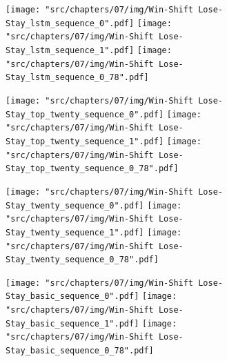 \begin{figure}[!htbp]
    \begin{subfigure}{\textwidth}
        \texttt{[image: "src/chapters/07/img/Win-Shift Lose-Stay\_lstm\_sequence\_0".pdf]}
        \texttt{[image: "src/chapters/07/img/Win-Shift Lose-Stay\_lstm\_sequence\_1".pdf]}
        \texttt{[image: "src/chapters/07/img/Win-Shift Lose-Stay\_lstm\_sequence\_0\_78".pdf]}
    \end{subfigure}
    \begin{subfigure}{\textwidth}
        \texttt{[image: "src/chapters/07/img/Win-Shift Lose-Stay\_top\_twenty\_sequence\_0".pdf]}
        \texttt{[image: "src/chapters/07/img/Win-Shift Lose-Stay\_top\_twenty\_sequence\_1".pdf]}
        \texttt{[image: "src/chapters/07/img/Win-Shift Lose-Stay\_top\_twenty\_sequence\_0\_78".pdf]}
    \end{subfigure}
    \begin{subfigure}{\textwidth}
        \texttt{[image: "src/chapters/07/img/Win-Shift Lose-Stay\_twenty\_sequence\_0".pdf]}
        \texttt{[image: "src/chapters/07/img/Win-Shift Lose-Stay\_twenty\_sequence\_1".pdf]}
        \texttt{[image: "src/chapters/07/img/Win-Shift Lose-Stay\_twenty\_sequence\_0\_78".pdf]}
    \end{subfigure}
    \begin{subfigure}{\textwidth}
        \texttt{[image: "src/chapters/07/img/Win-Shift Lose-Stay\_basic\_sequence\_0".pdf]}
        \texttt{[image: "src/chapters/07/img/Win-Shift Lose-Stay\_basic\_sequence\_1".pdf]}
        \texttt{[image: "src/chapters/07/img/Win-Shift Lose-Stay\_basic\_sequence\_0\_78".pdf]}
    \end{subfigure}
\end{figure}

